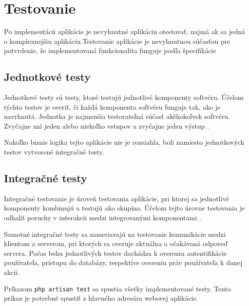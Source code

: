 \chapter{Testovanie}
Po implementácii aplikácie je nevyhnutné aplikáciu otestovať, najmä ak sa jedná o komplexnejšiu aplikáciu.Testovanie aplikácie je nevyhnutnou súčasťou pre potvrdenie, že implementovaná funkcionalita funguje podľa špecifikácie

\section{Jednotkové testy}
Jednotkové testy sú testy, ktoré testujú jednotlivé komponenty softvéru. Účelom týchto testov je overiť, či každá komponenta softvéru funguje tak, ako je navrhnutá. Jednotka je najmenšia testovateľná súčasť akéhokoľvek softvéru. Zvyčajne má jeden alebo niekoľko vstupov a zvyčajne jeden výstup \cite{co-je-unit-testing}.

Nakoľko biznis logika tejto aplikácie nie je rozsiahla, boli namiesto jednotkových testov vytvorené integračné testy.

\section{Integračné testy}
Integračné testovanie je úroveň testovania aplikácie, pri ktorej sa jednotlivé komponenty kombinujú a testujú ako skupina. Účelom tejto úrovne testovania je odhaliť poruchy v interakcii medzi integrovanými komponentami \cite{co-su-integracne-testy}.

Samotné integračné testy sa zameriavajú na testovanie komunikácie medzi klientom a serverom, pri ktorých sa overuje aktuálna a očakávaná odpoveď servera. Počas behu jednotlivých testov dochádza k overeniu autentifikácie používateľa, prístupu do databázy, respektíve overeniu práv používateľa k danej akcii.

\pagebreak

Príkazom \texttt{php artisan test} sa spustia všetky implementované testy. Tento príkaz je potrebné spustiť z hlavného adresára webovej aplikácie.

